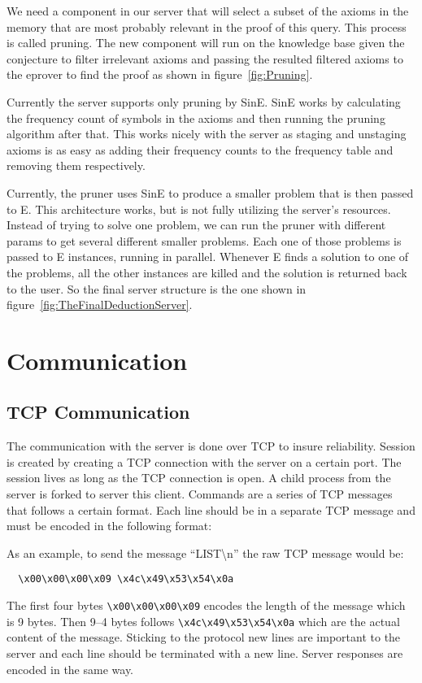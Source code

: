 We need a component in our server that will select a subset of the axioms in the memory that are most probably relevant in the proof of this query. This process is called pruning. The new component will run on the knowledge base given the conjecture to filter irrelevant axioms and passing the resulted filtered axioms to the eprover to find the proof as shown in figure~\ref{fig:Pruning}.


Currently the server supports only pruning by SinE. SinE works by calculating the frequency count of symbols in the axioms and then running the pruning algorithm after that. This works nicely with the server as staging and unstaging axioms is as easy as adding their frequency counts to the frequency table and removing them respectively.

Currently, the pruner uses SinE to produce a smaller problem that is then passed to E. This architecture works, but is not fully utilizing the server's resources. Instead of trying to solve one problem, we can run the pruner with different params to get several different smaller problems. Each one of those problems is passed to E instances, running in parallel. Whenever E finds a solution to one of the problems, all the other instances are killed and the solution is returned back to the user. So the final server structure is the one shown in figure~\ref{fig:TheFinalDeductionServer}.


\section{Communication}
\subsection{TCP Communication}\label{subsec:tcpCommunication}
The communication with the server is done over TCP to insure reliability. Session is created by creating a TCP connection with the server on a certain port. The session lives as long as the TCP connection is open. A child process from the server is forked to server this client. Commands are a series of TCP messages that follows a certain format. Each line should be in a separate TCP message and must be encoded in the following format:

As an example, to send the message ``LIST\textbackslash{}n'' the raw TCP message would be:
\begin{lstlisting}
  \x00\x00\x00\x09 \x4c\x49\x53\x54\x0a
\end{lstlisting}
The first four bytes \lstinline{\x00\x00\x00\x09} encodes the length of the message which is 9 bytes. Then 9--4 bytes follows \lstinline{\x4c\x49\x53\x54\x0a} which are the actual content of the message. Sticking to the protocol new lines are important to the server and each line should be terminated with a new line. Server responses are encoded in the same way.

